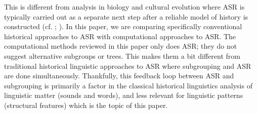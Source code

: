 \documentclass[12pt,letterpaper]{article}
\begin{document}
This is different from analysis in biology and cultural evolution where ASR is typically carried out as a separate next step after a reliable model of history is constructed (cf. \citealt{holland2020accuracy}; \citealt{evans2021uses}). In this paper, we are comparing specifically conventional historical approaches to ASR with computational approaches to ASR. The computational methods reviewed in this paper only does ASR; they do not suggest alternative subgroups or trees. This makes them a bit different from traditional historical linguistic approaches to ASR where subgrouping and ASR are done simultaneously. Thankfully, this feedback loop between ASR and subgrouping is primarily a factor in the classical historical linguistics analysis of linguistic matter (sounds and words), and less relevant for linguistic patterns (structural features) which is the topic of this paper.





\end{document}
